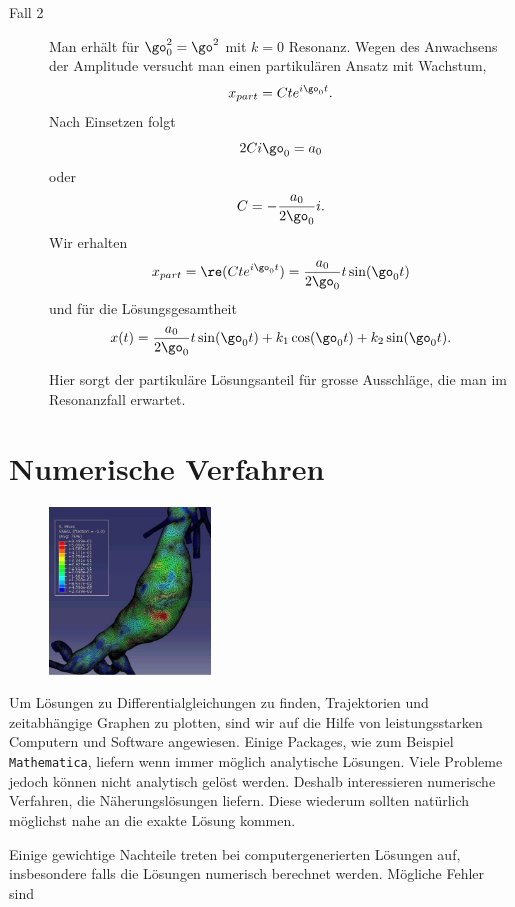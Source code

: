 \documentclass[%
11pt,%
twoside,%
titlepage,%
german,%
headsepline%
]{scrartcl}
\begin{document}
\begin{description}
\item[Fall 2] Man erh\"alt f\"ur $\go_0^2=\go^2$ mit $k=0$ Resonanz. Wegen des Anwachsens der Amplitude versucht man einen partikul\"aren Ansatz mit Wachstum,
$$x_{part}=Cte^{i\go_0 t}.$$
Nach Einsetzen folgt
$$2Ci\go_0=a_0$$
oder
$$C=-\frac{a_0}{2\go_0}i.$$
Wir erhalten
$$x_{part}=\re(Cte^{i\go_0 t})=\frac{a_0}{2\go_0}t\sin(\go_0 t)$$
und f\"ur die L\"osungsgesamtheit
$$
x(t)=\frac{a_0}{2\go_0}t\sin(\go_0 t)+k_1\cos(\go_0 t)+k_2\sin(\go_0 t).
$$
\begin{bem}
Hier sorgt der partikul\"are L\"osungsanteil f\"ur grosse Ausschl\"age, die man im Resonanzfall erwartet.
\end{bem}
\end{description}

\clearpage

\appendix

\section{Numerische Verfahren}
\begin{figure}
  \begin{center}
    \includegraphics[width=0.382\textwidth]{pictures/aneurysma}
  \end{center}
\end{figure}
Um L\"osungen zu Differentialgleichungen zu finden, Trajektorien und zeitabh\"angige Graphen zu plotten, sind wir auf die Hilfe von leistungsstarken Computern und Software angewiesen. Einige Packages, wie zum Beispiel \texttt{Mathematica}, liefern wenn immer m\"oglich analytische L\"osungen. Viele Probleme jedoch k\"onnen nicht analytisch gel\"ost werden. Deshalb interessieren numerische Verfahren, die N\"aherungsl\"osungen liefern. Diese wiederum sollten nat\"urlich m\"oglichst nahe an die exakte L\"osung kommen.

Einige gewichtige Nachteile treten bei computergenerierten L\"osungen auf, insbesondere falls die L\"osungen numerisch berechnet werden. M\"ogliche Fehler sind
\end{document}

